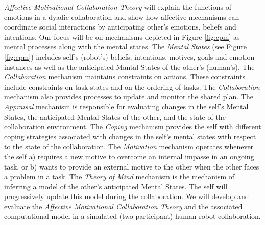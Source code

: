 \documentclass[letterpaper]{article}
\begin{document}
\textit{Affective Motivational Collaboration Theory} will explain the functions
of emotions in a dyadic collaboration and show how affective mechanisms can
coordinate social interactions by anticipating other's emotions, beliefs and
intentions. Our focus will be on mechanisms depicted in Figure \ref{fig:cpm} as
mental processes along with the mental states. The \textit{Mental States} (see
Figure \ref{fig:cpm}) includes self's (robot's) beliefs, intentions, motives,
goals and emotion instances as well as the anticipated Mantal States of the
other's (human's). The \textit{Collaboration} mechanism maintains constraints on
actions. These constraints include constraints on task states and on the
ordering of tasks. The \textit{Collaboration} mechanism also provides processes
to update and monitor the shared plan. The \textit{Appraisal} mechanism is
responsible for evaluating changes in the self's Mental States, the anticipated
Mental States of the other, and the state of the collaboration environment. The
\textit{Coping} mechanism provides the self with different coping strategies
associated with changes in the self's mental states with respect to the state of
the collaboration. The \textit{Motivation} mechanism operates whenever the self
a) requires a new motive to overcome an internal impasse in an ongoing task, or
b) wants to provide an external motive to the other when the other faces a
problem in a task. The \textit{Theory of Mind} mechanism is the mechanism of
inferring a model of the other's anticipated Mental States. The self will
progressively update this model during the collaboration. We will develop and
evaluate the \textit{Affective Motivational Collaboration Theory} and the
associated computational model in a simulated (two-participant) human-robot
collaboration.



\end{document}
